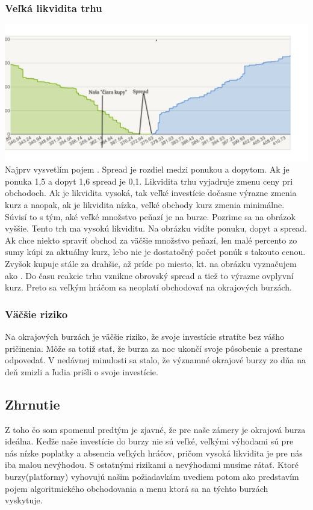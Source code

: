 \subsubsection{Veľká likvidita trhu} 
\includegraphics[width=1\textwidth]{stamp} 
Najprv vysvetlím pojem \cite{ZAC}. Spread je rozdiel medzi ponukou a dopytom. Ak je ponuka 1,5 a dopyt 1,6 spread je 0,1. Likvidita trhu vyjadruje zmenu ceny pri obchodoch. Ak je likvidita vysoká, tak veľké investície dočasne výrazne zmenia kurz a naopak, ak je likvidita nízka, veľké obchody kurz zmenia minimálne. Súvisí to s tým, aké veľké množstvo peňazí je na burze. Pozrime sa na obrázok vyššie. Tento trh ma vysokú likviditu. Na obrázku vidíte ponuku, dopyt a spread. Ak chce niekto spraviť obchod za väčšie množstvo peňazí, len malé percento zo sumy kúpi za aktuálny kurz, lebo nie je dostatočný počet ponúk s takouto cenou. Zvyšok kupuje stále za drahšie, až príde po miesto, kt. na obrázku vyznačujem ako . Do času reakcie trhu vznikne obrovský spread a tiež to výrazne ovplyvní kurz. Preto sa veľkým hráčom sa neoplatí obchodovať na okrajových burzách. 
\subsubsection{Väčšie riziko} 
Na okrajových burzách je väčšie riziko, že svoje investície stratíte bez vášho pričinenia. Môže sa totiž stať, že burza za noc ukončí svoje pôsobenie a prestane odpovedať. V nedávnej minulosti sa stalo, že významné okrajové burzy zo dňa na deň zmizli a ľudia prišli o svoje investície.  
\subsection{Zhrnutie} 
Z toho čo som spomenul predtým je zjavné,  že pre naše zámery je okrajová burza ideálna. Keďže naše investície do burzy nie sú veľké, veľkými výhodami sú pre nás nízke poplatky a absencia veľkých hráčov, pričom vysoká likvidita je pre nás iba malou nevýhodou. S ostatnými rizikami a nevýhodami musíme rátať. Ktoré burzy(platformy) vyhovujú našim požiadavkám uvediem potom ako predstavím pojem algoritmického obchodovania a menu ktorá sa na týchto burzách vyskytuje.
